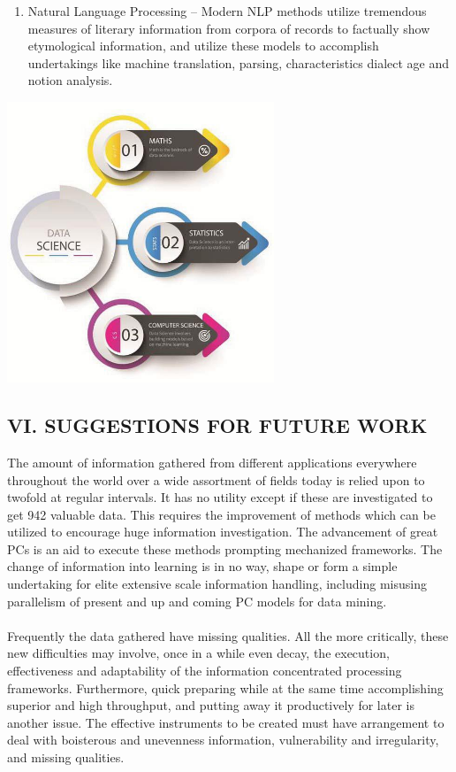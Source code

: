 \documentclass[a4paper]{article}
\begin{document}
\begin{multicols}{2}
\begin{enumerate}
\item Natural Language Processing – Modern NLP methods
utilize tremendous measures of literary information from
corpora of records to factually show etymological
information, and utilize these models to accomplish
undertakings like machine translation, parsing,
characteristics dialect age and notion analysis.
\end{enumerate}
 
\noindent 
    \begin{minipage}{\linewidth}
      \centering
      \includegraphics[width= 8cm]{fig3}
    \end{minipage}
\vspace{5pt}
\subsection*{VI. SUGGESTIONS FOR FUTURE WORK}
The amount of information gathered from different
applications everywhere throughout the world over a wide
assortment of fields today is relied upon to twofold at regular
intervals. It has no utility except if these are investigated to get
942
valuable data. This requires the improvement of methods
which can be utilized to encourage huge information
investigation. The advancement of great PCs is an aid to
execute these methods prompting mechanized frameworks.
The change of information into learning is in no way, shape or
form a simple undertaking for elite extensive scale information
handling, including misusing parallelism of present and up and
coming PC models for data mining. \\ \\
Frequently the data gathered have missing qualities. All the
more critically, these new difficulties may involve, once in a
while even decay, the execution, effectiveness and adaptability
of the information concentrated processing frameworks.
Furthermore, quick preparing while at the same time
accomplishing superior and high throughput, and putting away
it productively for later is another issue. The effective
instruments to be created must have arrangement to deal with
boisterous and unevenness information, vulnerability and
irregularity, and missing qualities. 


\end{multicols}
\end{document}
